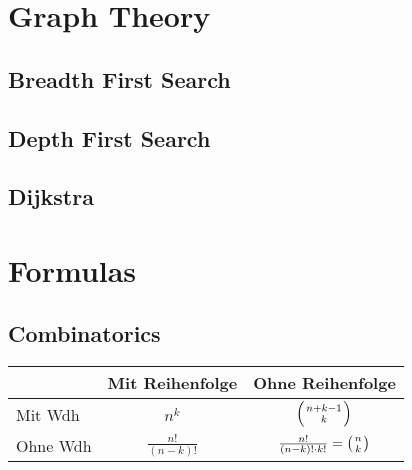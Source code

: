 \documentclass[11pt]{article}
\begin{document}
\section{Graph Theory}

\subsection{Breadth First Search}


\subsection{Depth First Search}


\subsection{Dijkstra}



\section{Formulas}

\subsection{Combinatorics}
\begin{tabular}{ | l | c | c |}
  \hline
   & Mit Reihenfolge & Ohne Reihenfolge \\ \hline
   Mit Wdh & $n^k$ & $\left( {n+k-1} \atop k \right)$  \\ \hline
   Ohne Wdh & $\frac{n!}{\left( n-k \right) !}$ & $\frac{n!}{\left( n-k \right) !\cdot k!} = \left( n \atop k \right)$  \\ \hline
\end{tabular}
\end{document}
